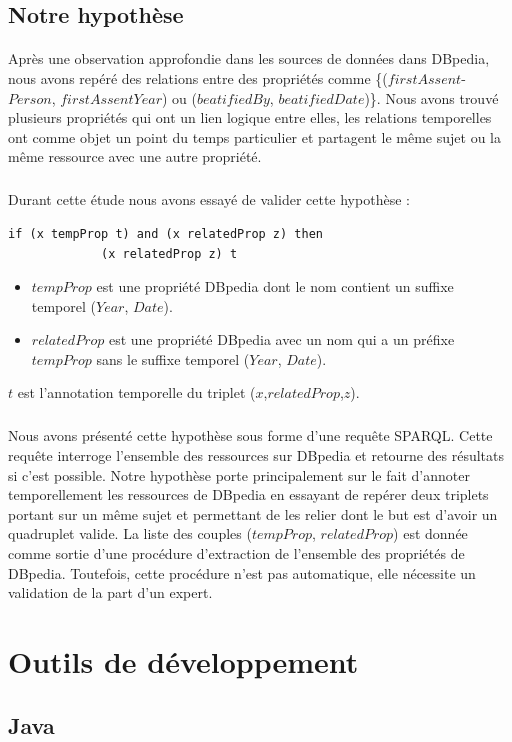 \subsection{Notre hypothèse}
\paragraph{}
Après une observation approfondie dans les sources de données dans DBpedia, nous avons repéré des relations entre des propriétés comme \{($firstAssent$-
$Person$, $firstAssentYear$) ou ($beatifiedBy$, $beatifiedDate$)\}. Nous avons trouvé plusieurs propriétés qui ont un lien logique entre elles, les relations temporelles ont comme objet un point du temps particulier et partagent le même sujet ou la même ressource avec une autre propriété.
\subparagraph{}
Durant cette étude nous avons essayé de valider cette hypothèse :
\begin{verbatim}
if (x tempProp t) and (x relatedProp z) then
             (x relatedProp z) t 
\end{verbatim}

\begin{itemize}
\item $tempProp$ est une propriété DBpedia dont le nom contient un suffixe temporel ($Year$, $Date$).
\item $relatedProp$ est une propriété DBpedia avec un nom qui a un préfixe $tempProp$ sans le suffixe temporel ($Year$, $Date$).
\end{itemize}
$t$ est l'annotation temporelle du triplet ($x$,$relatedProp$,$z$).
\subparagraph{}
Nous avons présenté cette hypothèse sous forme d'une requête SPARQL. Cette requête interroge l'ensemble des ressources sur DBpedia et retourne des résultats si c'est possible.
Notre hypothèse porte principalement sur le fait d'annoter temporellement les ressources de DBpedia en essayant de repérer deux triplets portant sur un même sujet et permettant de les relier dont le but est d'avoir un quadruplet valide. La liste des couples ($tempProp$, $relatedProp$)
est donnée comme sortie d'une procédure d'extraction de l'ensemble des propriétés de DBpedia. Toutefois, cette procédure n'est pas automatique, elle nécessite un validation de la part d'un expert.
\section{Outils de développement}
\subsection{ Java}

